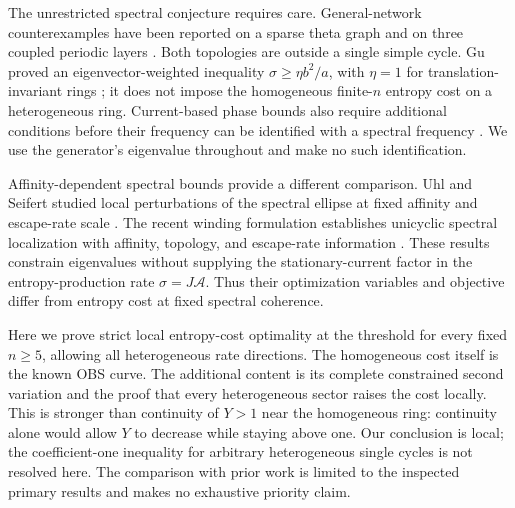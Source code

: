 \documentclass[aps,pre,onecolumn,11pt,notitlepage,nofootinbib]{revtex4-2}
\begin{document}
The unrestricted spectral conjecture requires care. General-network counterexamples have been reported on a sparse theta graph \cite{Jason2026} and on three coupled periodic layers \cite{Shiraishi2026}. Both topologies are outside a single simple cycle. Gu proved an eigenvector-weighted inequality $\sigma\geq\eta b^2/a$, with $\eta=1$ for translation-invariant rings \cite{Gu2026}; it does not impose the homogeneous finite-$n$ entropy cost on a heterogeneous ring. Current-based phase bounds also require additional conditions before their frequency can be identified with a spectral frequency \cite{Kolchinsky2026}. We use the generator's eigenvalue throughout and make no such identification.

Affinity-dependent spectral bounds provide a different comparison. Uhl and Seifert studied local perturbations of the spectral ellipse at fixed affinity and escape-rate scale \cite{UhlSeifert2019}. The recent winding formulation establishes unicyclic spectral localization with affinity, topology, and escape-rate information \cite{Winding2026}. These results constrain eigenvalues without supplying the stationary-current factor in the entropy-production rate $\sigma=J\mathcal A$. Thus their optimization variables and objective differ from entropy cost at fixed spectral coherence.

Here we prove strict local entropy-cost optimality at the threshold for every fixed $n\geq5$, allowing all heterogeneous rate directions. The homogeneous cost itself is the known OBS curve. The additional content is its complete constrained second variation and the proof that every heterogeneous sector raises the cost locally. This is stronger than continuity of $Y>1$ near the homogeneous ring: continuity alone would allow $Y$ to decrease while staying above one. Our conclusion is local; the coefficient-one inequality for arbitrary heterogeneous single cycles is not resolved here. The comparison with prior work is limited to the inspected primary results and makes no exhaustive priority claim.
\end{document}
